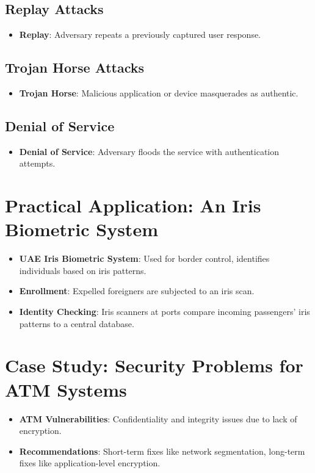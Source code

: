 \documentclass{article}
\begin{document}
\subsection{Replay Attacks}
\begin{itemize}
    \item \textbf{Replay}: Adversary repeats a previously captured user response.
\end{itemize}

\subsection{Trojan Horse Attacks}
\begin{itemize}
    \item \textbf{Trojan Horse}: Malicious application or device masquerades as authentic.
\end{itemize}

\subsection{Denial of Service}
\begin{itemize}
    \item \textbf{Denial of Service}: Adversary floods the service with authentication attempts.
\end{itemize}

\section{Practical Application: An Iris Biometric System}
\begin{itemize}
    \item \textbf{UAE Iris Biometric System}: Used for border control, identifies individuals based on iris patterns.
    \item \textbf{Enrollment}: Expelled foreigners are subjected to an iris scan.
    \item \textbf{Identity Checking}: Iris scanners at ports compare incoming passengers' iris patterns to a central database.
\end{itemize}

\section{Case Study: Security Problems for ATM Systems}
\begin{itemize}
    \item \textbf{ATM Vulnerabilities}: Confidentiality and integrity issues due to lack of encryption.
    \item \textbf{Recommendations}: Short-term fixes like network segmentation, long-term fixes like application-level encryption.
\end{itemize}
\end{document}
